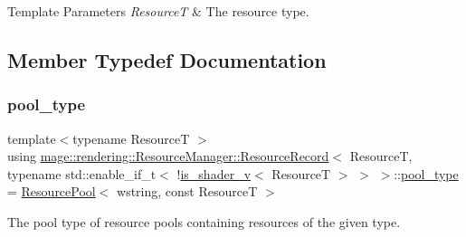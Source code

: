 \begin{DoxyTemplParams}{Template Parameters}
{\em ResourceT} & The resource type. \\
\hline
\end{DoxyTemplParams}


\subsection{Member Typedef Documentation}
\hypertarget{structmage_1_1rendering_1_1_resource_manager_1_1_resource_record_3_01_resource_t_00_01typename_0d1bec05cbaa53974b1eda0724091f851_a66a879f2c07d717cfc63ccd7d997397e}{}\label{structmage_1_1rendering_1_1_resource_manager_1_1_resource_record_3_01_resource_t_00_01typename_0d1bec05cbaa53974b1eda0724091f851_a66a879f2c07d717cfc63ccd7d997397e} 
\subsubsection{\texorpdfstring{pool\+\_\+type}{pool\_type}}
{\footnotesize\ttfamily template$<$typename ResourceT $>$ \\
using \hyperlink{structmage_1_1rendering_1_1_resource_manager_1_1_resource_record}{mage\+::rendering\+::\+Resource\+Manager\+::\+Resource\+Record}$<$ ResourceT, typename std\+::enable\+\_\+if\+\_\+t$<$ !\hyperlink{namespacemage_1_1rendering_a31fdbf9c96bd42e878e844c2b32b2fb9}{is\+\_\+shader\+\_\+v}$<$ ResourceT $>$ $>$ $>$\+::\hyperlink{structmage_1_1rendering_1_1_resource_manager_1_1_resource_record_3_01_resource_t_00_01typename_0d1bec05cbaa53974b1eda0724091f851_a66a879f2c07d717cfc63ccd7d997397e}{pool\+\_\+type} =  \hyperlink{classmage_1_1_resource_pool}{Resource\+Pool}$<$ wstring, const ResourceT $>$}

The pool type of resource pools containing resources of the given type. 